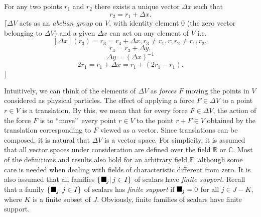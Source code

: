 \documentclass[aps,preprint]{revtex4}%
\providecommand{\U}[1]{\protect\rule{.1in}{.1in}}
\begin{document}
For any two points $r_{1}$ and $r_{2}$ there exists a unique vector $\Delta x$
such that
\begin{equation}
r_{2}=r_{1}+\Delta x.
\end{equation}
$\lceil\Delta V$ acts as an \emph{abelian group} on $V$, with identity element
$0$ (the zero vector belonging to $\Delta V)$ and a given $\Delta x$ can act
on any element of $V$ i.e.
\begin{equation}
\left[  \Delta x\right]  \left(  r_{3}\right)  =r_{3}=r_{4}+\Delta x,r_{3}\neq
r_{1},r;r_{2}\neq r_{1},r_{2},
\end{equation}%
\begin{equation}
r_{4}=r_{3}+\Delta y,
\end{equation}%
\begin{equation}
\Delta y=\left(  \Delta x\right)  ^{-1}%
\end{equation}%
\begin{equation}
2r_{1}=r_{1}+\Delta x=r_{1}+\left(  2r_{1}-r_{1}\right)  .
\end{equation}
$\rfloor$

Intuitively, we can think of the elements of $\Delta V$ as \emph{forces} $F$
moving the points in $V$ considered as physical particles. The effect of
applying a force $F\in\Delta V$ to a point $r\in V$ is a translation. By this,
we mean that for every force $F\in\Delta V$, the action of the force $F$ is to
\textquotedblleft move\textquotedblright\ every point $r\in V$ to the point
$r+F\in V$ obtained by the translation corresponding to $F$ viewed as a
vector. Since translations can be composed, it is natural that $\Delta V$ is a
vector space. For simplicity, it is assumed that all vector spaces under
consideration are defined over the field $\mathbb{R}$ or $\mathbb{C}$. Most of
the definitions and results also hold for an arbitrary field $\mathbb{F}$,
although some care is needed when dealing with fields of characteristic
different from zero. It is also assumed that all families $\left\{  \left.
\U{3bb} _{j}\right\vert j\in I\right\}  $ of scalars have \emph{finite
support}. Recall that a family $\left\{  \left.  \U{3bb} _{j}\right\vert j\in
I\right\}  $ of scalars has \emph{finite support }if $\U{3bb} _{j}=0$ for all
$j\in J-K$, where $K$ is a finite subset of $J$. Obviously, finite families of
scalars have finite support.
\end{document}
